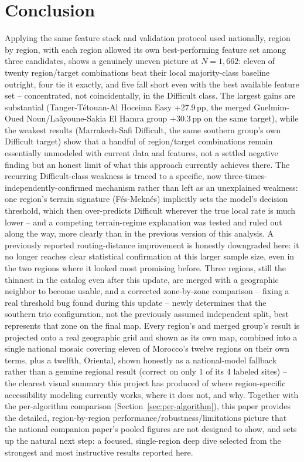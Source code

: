 \documentclass[11pt,a4paper]{article}
\begin{document}
\section{Conclusion}
Applying the same feature stack and validation protocol used nationally, region by region, with each region allowed its own best-performing feature set among three candidates, shows a genuinely uneven picture at $N=1{,}662$: eleven of twenty region/target combinations beat their local majority-class baseline outright, four tie it exactly, and five fall short even with the best available feature set -- concentrated, not coincidentally, in the Difficult class. The largest gains are substantial (Tanger-Tétouan-Al Hoceima Easy +27.9\,pp, the merged Guelmim-Oued Noun/Laâyoune-Sakia El Hamra group +30.3\,pp on the same target), while the weakest results (Marrakech-Safi Difficult, the same southern group's own Difficult target) show that a handful of region/target combinations remain essentially unmodeled with current data and features, not a settled negative finding but an honest limit of what this approach currently achieves there. The recurring Difficult-class weakness is traced to a specific, now three-times-independently-confirmed mechanism rather than left as an unexplained weakness: one region's terrain signature (Fés-Meknés) implicitly sets the model's decision threshold, which then over-predicts Difficult wherever the true local rate is much lower -- and a competing terrain-regime explanation was tested and ruled out along the way, more clearly than in the previous version of this analysis. A previously reported routing-distance improvement is honestly downgraded here: it no longer reaches clear statistical confirmation at this larger sample size, even in the two regions where it looked most promising before. Three regions, still the thinnest in the catalog even after this update, are merged with a geographic neighbor to become usable, and a corrected zone-by-zone comparison -- fixing a real threshold bug found during this update -- newly determines that the southern trio configuration, not the previously assumed independent split, best represents that zone on the final map. Every region's and merged group's result is projected onto a real geographic grid and shown as its own map, combined into a single national mosaic covering eleven of Morocco's twelve regions on their own terms, plus a twelfth, Oriental, shown honestly as a national-model fallback rather than a genuine regional result (correct on only 1 of its 4 labeled sites) -- the clearest visual summary this project has produced of where region-specific accessibility modeling currently works, where it does not, and why. Together with the per-algorithm comparison (Section~\ref{sec:per-algorithm}), this paper provides the detailed, region-by-region performance/robustness/limitations picture that the national companion paper's pooled figures are not designed to show, and sets up the natural next step: a focused, single-region deep dive selected from the strongest and most instructive results reported here.
\end{document}
